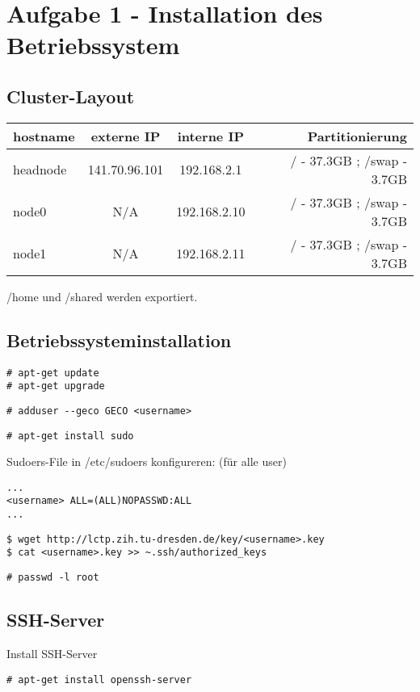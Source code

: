 \chapter{Aufgabe 1 - Installation des Betriebssystem}
\section{Cluster-Layout}
\begin{tabular}{ l c c r }
    hostname & externe IP & interne IP & Partitionierung \\
    \hline
    headnode & 141.70.96.101 & 192.168.2.1 & / - 37.3GB ; /swap - 3.7GB \\
    node0 & N/A & 192.168.2.10 & / - 37.3GB ; /swap - 3.7GB \\
    node1 & N/A & 192.168.2.11 & / - 37.3GB ; /swap - 3.7GB \\
\end{tabular}

/home und /shared werden exportiert.

\section{Betriebssysteminstallation}
\begin{lstlisting}[style=Bash]
# apt-get update 
# apt-get upgrade 
\end{lstlisting}
\begin{lstlisting}[style=Bash]
# adduser --geco GECO <username>
\end{lstlisting}
\begin{lstlisting}[style=Bash]
# apt-get install sudo
\end{lstlisting}
Sudoers-File in /etc/sudoers konfigureren:
(für alle user)
\begin{lstlisting}[style=Bash]
...
<username> ALL=(ALL)NOPASSWD:ALL
...
\end{lstlisting}
\begin{lstlisting}[style=Bash]
$ wget http://lctp.zih.tu-dresden.de/key/<username>.key
$ cat <username>.key >> ~.ssh/authorized_keys
\end{lstlisting}
\begin{lstlisting}[style=Bash]
# passwd -l root 
\end{lstlisting}


\section{SSH-Server}
Install SSH-Server
\begin{lstlisting}[style=Bash]
# apt-get install openssh-server 
\end{lstlisting}


